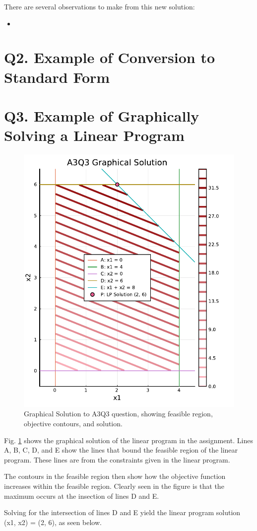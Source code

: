 \documentclass{article}
\begin{document}
    There are several observations to make from this new solution:

    \begin{itemize}
        \item 
    \end{itemize}


    \section{Q2. Example of Conversion to Standard Form}

    \section{Q3. Example of Graphically Solving a Linear Program}

    \begin{figure}[H]
        \centering
        \includegraphics[width=0.5\linewidth]{A3Q3_Plot.pdf}
        \caption{Graphical Solution to A3Q3 question, showing feasible region, objective contours, and solution.}
        \label{fig:A3Q3_GraphicalSolution}
    \end{figure}

    Fig. \ref{fig:A3Q3_GraphicalSolution} shows the graphical solution of the linear program in the assignment.
    Lines A, B, C, D, and E show the lines that bound the feasible region of the linear program.
    These lines are from the constraints given in the linear program.

    The contours in the feasible region then show how the objective function increases within the feasible region.
    Clearly seen in the figure is that the maximum occurs at the insection of lines D and E.

    Solving for the intersection of lines D and E yield the linear program solution (x1, x2) = (2, 6), as seen below.
\end{document}
